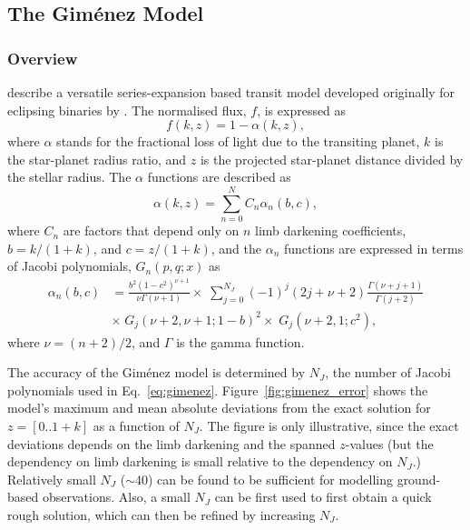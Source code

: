 \documentclass[usenatbib,usegraphicx,useAMS]{mn2e}
\newcommand{\gimenez}{Gim\'enez\xspace}
\begin{document}
{\subsection{The \gimenez Model}
\label{sec:gimenez_model}
\subsubsection{Overview}

\citet{Gimenez2006,Gimenez2007} describe a versatile series-expansion based transit model developed originally for 
eclipsing binaries by \citet{Kopal1977}.  The normalised flux, $f$, is expressed as
\begin{equation}
 f(k,z) = 1 - \alpha(k,z), \label{eq:gimenez_flux}
\end{equation}
where $\alpha$ stands for the fractional loss of light due to the transiting planet, $k$ is the star-planet radius 
ratio, and $z$ is the projected star-planet distance divided by the stellar radius. The $\alpha$ functions are described 
as \begin{equation}
 \alpha(k,z) = \sum_{n=0}^N C_n \alpha_n(b,c), \label{eq:gimenez_alpha}
\end{equation}
where $C_n$ are factors that depend only on $n$ limb darkening coefficients, 
$b= k/(1+k)$, and $c=z/(1+k)$, and the $\alpha_n$ functions are expressed in terms of Jacobi polynomials, $G_n(p,q;x)$ as
\begin{eqnarray}
 \alpha_n(b,c) &= \frac{b^2 (1-c^2)^{\nu+1}}{\nu \Gamma(\nu+1)} \times \; \sum_{j=0}^{N_J} (-1)^j (2j+\nu+2) 
                  \frac{\Gamma(\nu+j+1)}{\Gamma(j+2)}  \nonumber \\
               &\times \; G_j(\nu+2, \nu+1; 1-b)^2 \times \; G_j(\nu+2, 1; c^2), \label{eq:gimenez}
\end{eqnarray}
where $\nu = (n+2)/2$, and $\Gamma$ is the gamma function.

The accuracy of the \gimenez model is determined by $N_J$, the number of Jacobi polynomials used in 
Eq.~\ref{eq:gimenez}.  Figure~\ref{fig:gimenez_error} shows the model's maximum and mean absolute deviations from the 
exact solution for $z=[0..1+k]$ as a function of $N_J$. The figure is only illustrative, since the exact deviations 
depends on the limb darkening and the spanned $z$-values (but the dependency on limb darkening is small relative to the 
dependency on $N_J$.) Relatively small $N_J$ ($\sim$40) can be found to be sufficient for modelling ground-based 
observations. Also, a small $N_J$ can be first used to first obtain a quick rough solution, which can then be refined by 
increasing $N_J$.

}
\end{document}
